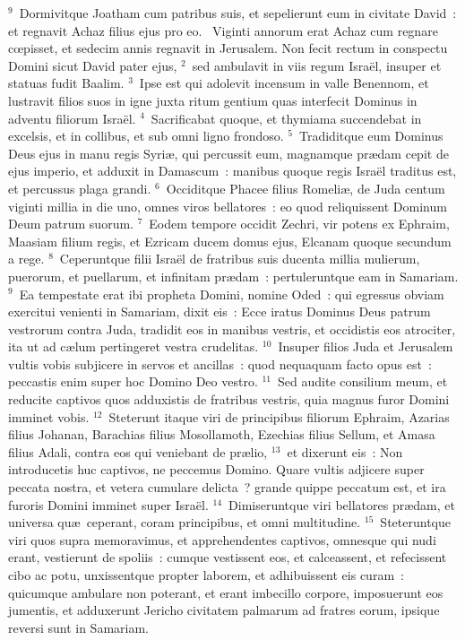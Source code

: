 ${}^{9}$~Dormivitque Joatham cum patribus suis, et sepelierunt eum in civitate David~: et regnavit Achaz filius ejus pro eo.
~Viginti annorum erat Achaz cum regnare cœpisset, et sedecim annis regnavit in Jerusalem. Non fecit rectum in conspectu Domini sicut David pater ejus,
${}^{2}$~sed ambulavit in viis regum Isra\"el, insuper et statuas fudit Baalim.
${}^{3}$~Ipse est qui adolevit incensum in valle Benennom, et lustravit filios suos in igne juxta ritum gentium quas interfecit Dominus in adventu filiorum Isra\"el.
${}^{4}$~Sacrificabat quoque, et thymiama succendebat in excelsis, et in collibus, et sub omni ligno frondoso.
${}^{5}$~Tradiditque eum Dominus Deus ejus in manu regis Syri\ae , qui percussit eum, magnamque pr\ae dam cepit de ejus imperio, et adduxit in Damascum~: manibus quoque regis Isra\"el traditus est, et percussus plaga grandi.
${}^{6}$~Occiditque Phacee filius Romeli\ae , de Juda centum viginti millia in die uno, omnes viros bellatores~: eo quod reliquissent Dominum Deum patrum suorum.
${}^{7}$~Eodem tempore occidit Zechri, vir potens ex Ephraim, Maasiam filium regis, et Ezricam ducem domus ejus, Elcanam quoque secundum a rege.
${}^{8}$~Ceperuntque filii Isra\"el de fratribus suis ducenta millia mulierum, puerorum, et puellarum, et infinitam pr\ae dam~: pertuleruntque eam in Samariam.
${}^{9}$~Ea tempestate erat ibi propheta Domini, nomine Oded~: qui egressus obviam exercitui venienti in Samariam, dixit eis~: Ecce iratus Dominus Deus patrum vestrorum contra Juda, tradidit eos in manibus vestris, et occidistis eos atrociter, ita ut ad c\ae lum pertingeret vestra crudelitas.
${}^{10}$~Insuper filios Juda et Jerusalem vultis vobis subjicere in servos et ancillas~: quod nequaquam facto opus est~: peccastis enim super hoc Domino Deo vestro.
${}^{11}$~Sed audite consilium meum, et reducite captivos quos adduxistis de fratribus vestris, quia magnus furor Domini imminet vobis.
${}^{12}$~Steterunt itaque viri de principibus filiorum Ephraim, Azarias filius Johanan, Barachias filius Mosollamoth, Ezechias filius Sellum, et Amasa filius Adali, contra eos qui veniebant de pr\ae lio,
${}^{13}$~et dixerunt eis~: Non introducetis huc captivos, ne peccemus Domino. Quare vultis adjicere super peccata nostra, et vetera cumulare delicta~? grande quippe peccatum est, et ira furoris Domini imminet super Isra\"el.
${}^{14}$~Dimiseruntque viri bellatores pr\ae dam, et universa qu\ae\ ceperant, coram principibus, et omni multitudine.
${}^{15}$~Steteruntque viri quos supra memoravimus, et apprehendentes captivos, omnesque qui nudi erant, vestierunt de spoliis~: cumque vestissent eos, et calceassent, et refecissent cibo ac potu, unxissentque propter laborem, et adhibuissent eis curam~: quicumque ambulare non poterant, et erant imbecillo corpore, imposuerunt eos jumentis, et adduxerunt Jericho civitatem palmarum ad fratres eorum, ipsique reversi sunt in Samariam.



